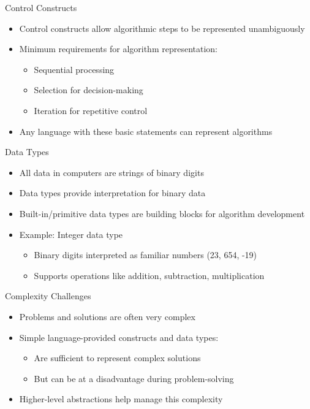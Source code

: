 \begin{frame}{Control Constructs}
    \begin{itemize}
        \item Control constructs allow algorithmic steps to be represented unambiguously
        \item Minimum requirements for algorithm representation:
        \begin{itemize}
            \item Sequential processing
            \item Selection for decision-making
            \item Iteration for repetitive control
        \end{itemize}
        \item Any language with these basic statements can represent algorithms
    \end{itemize}
\end{frame}

\begin{frame}{Data Types}
    \begin{itemize}
        \item All data in computers are strings of binary digits
        \item Data types provide interpretation for binary data
        \item Built-in/primitive data types are building blocks for algorithm development
        \item Example: Integer data type
        \begin{itemize}
            \item Binary digits interpreted as familiar numbers (23, 654, -19)
            \item Supports operations like addition, subtraction, multiplication
        \end{itemize}
    \end{itemize}
\end{frame}

\begin{frame}{Complexity Challenges}
    \begin{itemize}
        \item Problems and solutions are often very complex
        \item Simple language-provided constructs and data types:
        \begin{itemize}
            \item Are sufficient to represent complex solutions
            \item But can be at a disadvantage during problem-solving
        \end{itemize}
        \item Higher-level abstractions help manage this complexity
    \end{itemize}
\end{frame}

